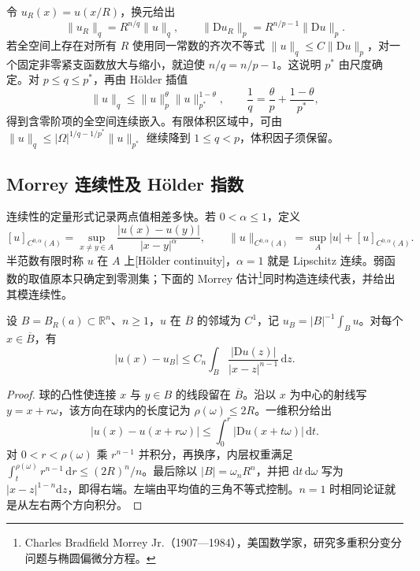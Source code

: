 令 \(u_R(x)=u(x/R)\)，换元给出
\[
	\|u_R\|_q=R^{n/q}\|u\|_q,\qquad
	\|\mathrm Du_R\|_p=R^{n/p-1}\|\mathrm Du\|_p.
\]
若全空间上存在对所有 \(R\) 使用同一常数的齐次不等式 \(\|u\|_q\le C\|\mathrm Du\|_p\)，对一个固定非零紧支函数放大与缩小，就迫使 \(n/q=n/p-1\)。这说明 \(p^*\) 由尺度确定。对 \(p\le q\le p^*\)，再由 Hölder 插值
\[
	\|u\|_q\le\|u\|_p^{\theta}\|u\|_{p^*}^{1-\theta},\qquad
	\frac1q=\frac\theta p+\frac{1-\theta}{p^*},
\]
得到含零阶项的全空间连续嵌入。有限体积区域中，可由 \(\|u\|_q\le|\Omega|^{1/q-1/p^*}\|u\|_{p^*}\) 继续降到 \(1\le q<p\)，体积因子须保留。

\subsection{Morrey 连续性及 Hölder 指数}
\label{g3:subsec:1103:03}
连续性的定量形式记录两点值相差多快。若 \(0<\alpha\le1\)，定义
\[
	[u]_{C^{0,\alpha}(A)}=\sup_{x\ne y\in A}\frac{|u(x)-u(y)|}{|x-y|^\alpha},
	\qquad \|u\|_{C^{0,\alpha}(A)}=\sup_A|u|+[u]_{C^{0,\alpha}(A)}.
\]
半范数有限时称 \(u\) 在 \(A\) 上[Hölder continuity]，\(\alpha=1\) 就是 Lipschitz 连续。弱函数的取值原本只确定到零测集；下面的 Morrey 估计\footnote{Charles Bradfield Morrey Jr.（1907—1984），美国数学家，研究多重积分变分问题与椭圆偏微分方程。}同时构造连续代表，并给出其模连续性。

\begin{lemma}\label{g3:lem:ball-oscillation-potential}
	设 \(B=B_R(a)\subset\mathbb R^n\)、\(n\ge1\)，\(u\) 在 \(\overline B\) 的邻域为 \(C^1\)，记 \(u_B=|B|^{-1}\int_Bu\)。对每个 \(x\in\overline B\)，有
	\begin{equation}\label{g3:eq:ball-oscillation-potential}
		|u(x)-u_B|\le C_n\int_B\frac{|\mathrm Du(z)|}{|x-z|^{n-1}}\,\mathrm dz.
	\end{equation}
\end{lemma}
\begin{proof}
	球的凸性使连接 \(x\) 与 \(y\in B\) 的线段留在 \(\overline B\)。沿以 \(x\) 为中心的射线写 \(y=x+r\omega\)，该方向在球内的长度记为 \(\rho(\omega)\le2R\)。一维积分给出
	\[
		|u(x)-u(x+r\omega)|\le\int_0^r|\mathrm Du(x+t\omega)|\,\mathrm dt.
	\]
	对 \(0<r<\rho(\omega)\) 乘 \(r^{n-1}\) 并积分，再换序，内层权重满足
	\(\int_t^{\rho(\omega)}r^{n-1}\,\mathrm dr\le(2R)^n/n\)。最后除以 \(|B|=\omega_nR^n\)，并把 \(\mathrm dt\,\mathrm d\omega\) 写为 \(|x-z|^{1-n}\mathrm dz\)，即得右端。左端由平均值的三角不等式控制。\(n=1\) 时相同论证就是从左右两个方向积分。
\end{proof}

